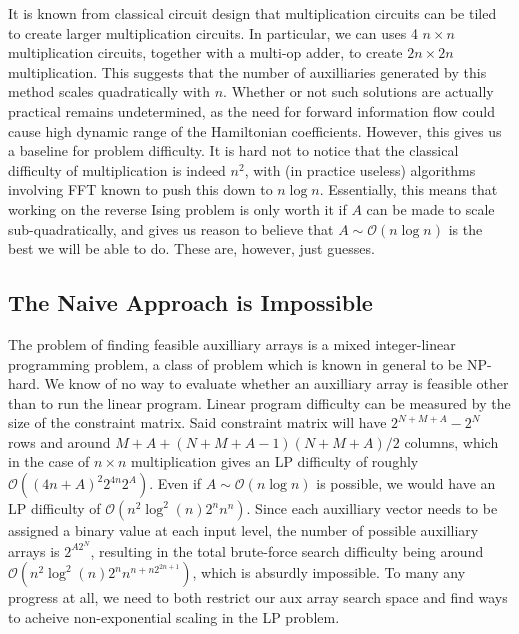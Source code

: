 \documentclass{article}
\begin{document}
It is known from classical circuit design that multiplication circuits can be tiled to create larger multiplication circuits. In particular, we can uses 4 $n\times n$ multiplication circuits, together with a multi-op adder, to create $2n \times 2n$ multiplication. This suggests that the number of auxilliaries generated by this method scales quadratically with $n$. Whether or not such solutions are actually practical remains undetermined, as the need for forward information flow could cause high dynamic range of the Hamiltonian coefficients. However, this gives us a baseline for problem difficulty. It is hard not to notice that the classical difficulty of multiplication is indeed $n^2$, with (in practice useless) algorithms involving FFT known to push this down to $n\log n$. Essentially, this means that working on the reverse Ising problem is only worth it if $A$ can be made to scale sub-quadratically, and gives us reason to believe that $A \sim \mathcal{O}(n\log n)$ is the best we will be able to do. These are, however, just guesses.

\subsection{The Naive Approach is Impossible}

The problem of finding feasible auxilliary arrays is a mixed integer-linear programming problem, a class of problem which is known in general to be NP-hard. We know of no way to evaluate whether an auxilliary array is feasible other than to run the linear program. Linear program difficulty can be measured by the size of the constraint matrix. Said constraint matrix will have $2^{N + M + A} - 2^{N}$ rows and around $M+A+(N+M+A-1)(N+M+A)/2$ columns, which in the case of $n\times n$ multiplication gives an LP difficulty of roughly $\mathcal{O}((4n+A)^2 2^{4n}2^A)$. Even if $A \sim \mathcal{O}(n\log n)$ is possible, we would have an LP difficulty of $\mathcal{O}(n^2\log^2(n) 2^n n^n)$. Since each auxilliary vector needs to be assigned a binary value at each input level, the number of possible auxilliary arrays is $2^{A2^N}$, resulting in the total brute-force search difficulty being around $\mathcal{O}(n^2\log^2(n)2^nn^{n +n2^{2n+1}})$, which is absurdly impossible. To many any progress at all, we need to both restrict our aux array search space and find ways to acheive non-exponential scaling in the LP problem.
\end{document}
